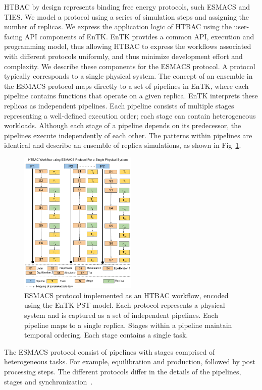 HTBAC by design represents binding free energy protocols, such 
ESMACS and TIES. We model a protocol using a series of 
simulation steps and assigning the number of replicas. 
We express the application logic of HTBAC using the user-facing API 
components of EnTK. EnTK provides a common API,
execution and programming model, thus allowing HTBAC to express the workflows
associated with different protocols uniformly, and thus minimize development
effort and complexity. We describe these components for the ESMACS
protocol\@. A protocol typically corresponds to a single physical
system. The concept of an ensemble in the ESMACS protocol maps directly to
a set of pipelines in EnTK, where each pipeline contains functions that operate
on a given replica. EnTK interprets these replicas as independent pipelines.
Each pipeline consists of multiple stages representing a well-defined execution
order; each stage can contain heterogeneous workloads. Although each stage of a
pipeline depends on its predecessor, the pipelines execute independently of each
other. The patterns within pipelines are identical and describe an ensemble of replica
simulations, as shown in Fig~\ref{figure:HTBAC}.


\begin{figure}
\centering
  \includegraphics[width=0.5\textwidth]{FIGURES/HTBAC_Workflow_ESMACS.pdf}
  \caption{ESMACS protocol implemented as an HTBAC workflow, encoded using the EnTK PST model. 
  Each protocol represents a physical system and is captured as a set of independent pipelines. 
  Each pipeline maps to a single replica. Stages within a pipeline maintain temporal 
  ordering. Each stage contains a single task.}
  \label{figure:HTBAC}
\end{figure}

The ESMACS protocol consist of pipelines with stages comprised of heterogeneous tasks. 
For example, equilibration and production, followed by post processing steps. 
The different protocols differ in the details of the pipelines, stages and 
synchronization~\cite{Bhati2017}.






